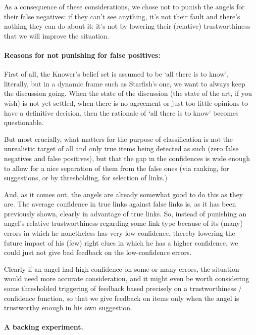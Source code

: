 \documentclass[11pt]{article}
\begin{document}
As a consequence of these considerations, we chose not to punish the angels for their false negatives: if they can't see anything, it's not their fault and there's nothing they can do about it: it's not by lowering their (relative) trustworthiness that we will improve the situation.

\paragraph{Reasons for not punishing for false positives:}

First of all, the Knower's belief set is assumed to be `all there is to know', literally, but in a dynamic frame such as Starfish's one, we want to always keep the discussion going. When the state of the discussion (the state of the art, if you wish) is not yet settled, when there is no agreement or just too little opinions to have a definitive decision, then the rationale of `all there is to know' becomes questionable.

But most crucially, what matters for the purpose of classification is not the unrealistic target of all and only true items being detected as such (zero false negatives and false positives), but that the gap in the confidences is wide enough to allow for a nice separation of them from the false ones (via ranking, for suggestions, or by thresholding, for selection of links.)

And, as it comes out, the angels are already somewhat good to do this as they are. The average confidence in true links against false links is, as it has been previously shown, clearly in advantage of true links. So, instead of punishing an angel's relative trustworthiness regarding some link type because of its (many) errors in which he nonetheless has very low confidence, thereby lowering the future impact of his (few) right clues in which he has a higher confidence, we could just not give bad feedback on the low-confidence errors.

Clearly if an angel had high confidence on some or many errors, the situation would need more accurate consideration, and it might even be worth considering some thresholded triggering of feedback based precisely on a trustworthiness / confidence function, so that we give feedback on items only when the angel is trustworthy enough in his own suggestion.


\paragraph{A backing experiment.}
\end{document}
